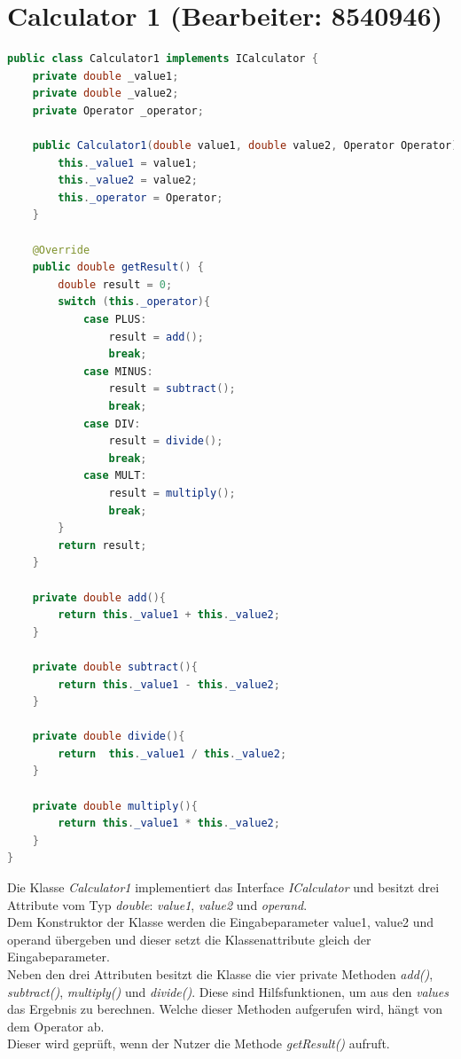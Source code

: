 \chapter{Calculator 1 (Bearbeiter: 8540946)}
\begin{lstlisting}[language=Java,basicstyle=\scriptsize, caption= Calculator 1]
public class Calculator1 implements ICalculator {
    private double _value1;
    private double _value2;
    private Operator _operator;

    public Calculator1(double value1, double value2, Operator Operator){
        this._value1 = value1;
        this._value2 = value2;
        this._operator = Operator;
    }

    @Override
    public double getResult() {
        double result = 0;
        switch (this._operator){
            case PLUS:
                result = add();
                break;
            case MINUS:
                result = subtract();
                break;
            case DIV:
                result = divide();
                break;
            case MULT:
                result = multiply();
                break;
        }
        return result;
    }

    private double add(){
        return this._value1 + this._value2;
    }

    private double subtract(){
        return this._value1 - this._value2;
    }

    private double divide(){
        return  this._value1 / this._value2;
    }

    private double multiply(){
        return this._value1 * this._value2;
    }
}
\end{lstlisting}
Die Klasse \textit{Calculator1} implementiert das Interface \textit{ICalculator} und besitzt drei Attribute vom Typ \textit{double}: \textit{\textunderscore value1}, \textit{\textunderscore value2} und \textit{\textunderscore operand}.\\
Dem Konstruktor der Klasse werden die Eingabeparameter value1, value2 und operand übergeben und dieser setzt die Klassenattribute gleich der Eingabeparameter.\\
Neben den drei Attributen besitzt die Klasse die vier private Methoden \textit{add()}, \textit{subtract()}, \textit{multiply()} und \textit{divide()}.
Diese sind Hilfsfunktionen, um aus den \textit{values} das Ergebnis zu berechnen.
Welche dieser Methoden aufgerufen wird, hängt von dem Operator ab.\\
Dieser wird geprüft, wenn der Nutzer die Methode \textit{getResult()} aufruft.
